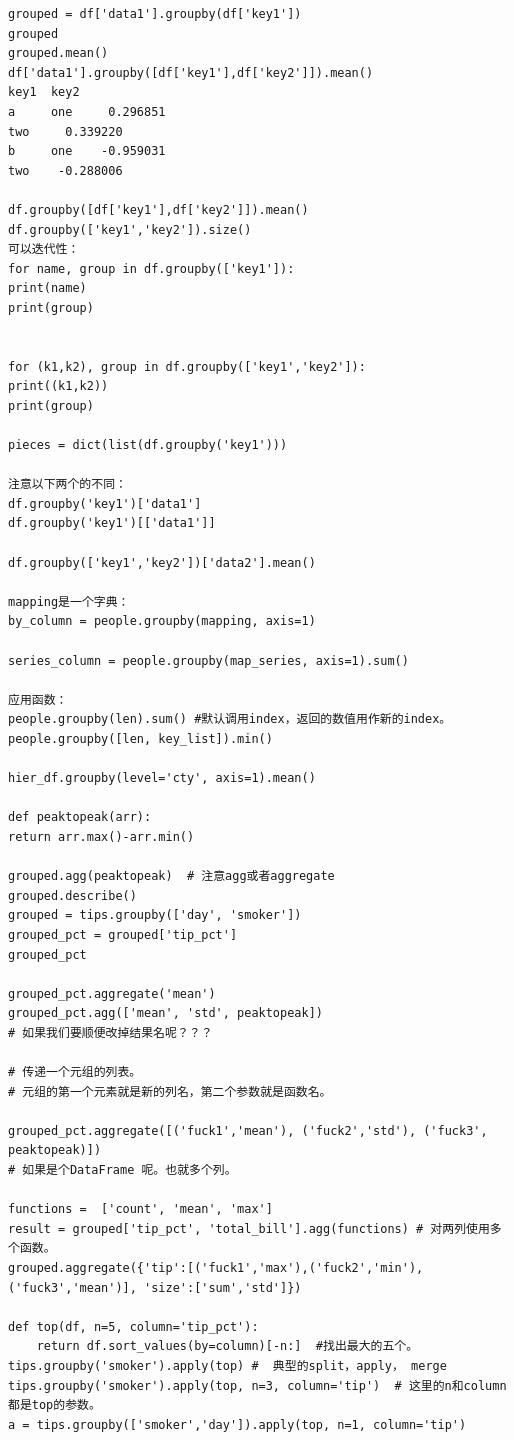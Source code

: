 \documentclass{article}
\begin{document}
\begin{lstlisting}
grouped = df['data1'].groupby(df['key1']) 
grouped
grouped.mean()
df['data1'].groupby([df['key1'],df['key2']]).mean()
key1  key2
a     one     0.296851
two     0.339220
b     one    -0.959031
two    -0.288006

df.groupby([df['key1'],df['key2']]).mean()
df.groupby(['key1','key2']).size()
可以迭代性：
for name, group in df.groupby(['key1']):
print(name)
print(group)


for (k1,k2), group in df.groupby(['key1','key2']):
print((k1,k2))
print(group)

pieces = dict(list(df.groupby('key1')))

注意以下两个的不同：
df.groupby('key1')['data1']
df.groupby('key1')[['data1']]

df.groupby(['key1','key2'])['data2'].mean()

mapping是一个字典：
by_column = people.groupby(mapping, axis=1)

series_column = people.groupby(map_series, axis=1).sum()

应用函数：
people.groupby(len).sum() #默认调用index，返回的数值用作新的index。
people.groupby([len, key_list]).min()

hier_df.groupby(level='cty', axis=1).mean()

def peaktopeak(arr):
return arr.max()-arr.min()

grouped.agg(peaktopeak)  # 注意agg或者aggregate
grouped.describe()
grouped = tips.groupby(['day', 'smoker'])
grouped_pct = grouped['tip_pct']
grouped_pct

grouped_pct.aggregate('mean')
grouped_pct.agg(['mean', 'std', peaktopeak])
# 如果我们要顺便改掉结果名呢？？？

# 传递一个元组的列表。
# 元组的第一个元素就是新的列名，第二个参数就是函数名。

grouped_pct.aggregate([('fuck1','mean'), ('fuck2','std'), ('fuck3', peaktopeak)])
# 如果是个DataFrame 呢。也就多个列。

functions =  ['count', 'mean', 'max']
result = grouped['tip_pct', 'total_bill'].agg(functions) # 对两列使用多个函数。
grouped.aggregate({'tip':[('fuck1','max'),('fuck2','min'),('fuck3','mean')], 'size':['sum','std']})

def top(df, n=5, column='tip_pct'):
	return df.sort_values(by=column)[-n:]  #找出最大的五个。
tips.groupby('smoker').apply(top) #  典型的split，apply， merge
tips.groupby('smoker').apply(top, n=3, column='tip')  # 这里的n和column都是top的参数。
a = tips.groupby(['smoker','day']).apply(top, n=1, column='tip')

\end{lstlisting}
\end{document}

